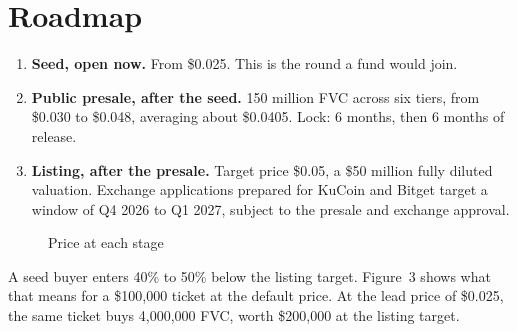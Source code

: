 \documentclass[paper=a4,captions=tableheading]{scrartcl}
\providecommand{\tightlist}{\setlength{\itemsep}{0pt}\setlength{\parskip}{0pt}}
\begin{document}
\section{Roadmap}

\begin{enumerate}
\tightlist
\item \textbf{Seed, open now.} From \$0.025. This is the round a fund would join.
\item \textbf{Public presale, after the seed.} 150 million FVC across six tiers, from \$0.030 to \$0.048, averaging about \$0.0405. Lock: 6 months, then 6 months of release.
\item \textbf{Listing, after the presale.} Target price \$0.05, a \$50 million fully diluted valuation. Exchange applications prepared for KuCoin and Bitget target a window of Q4 2026 to Q1 2027, subject to the presale and exchange approval.
\end{enumerate}

\begin{figure}
\caption{Price at each stage}
\centering
{}
\end{figure}

A seed buyer enters 40\% to 50\% below the listing target. Figure~3 shows what that means for a \$100,000 ticket at the default price. At the lead price of \$0.025, the same ticket buys 4,000,000 FVC, worth \$200,000 at the listing target.
\end{document}
